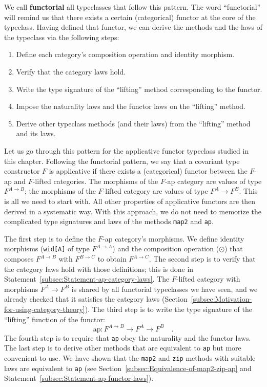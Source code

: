 We call \textbf{functorial} all
typeclasses that follow this pattern. The word \textsf{``}functorial\textsf{''} will
remind us that there exists a certain (categorical) functor at the
core of the typeclass. Having defined that functor, we can derive
the methods and the laws of the typeclass via the following steps:
\begin{enumerate}
\item Define each category\textsf{'}s composition operation and identity morphism.
\item Verify that the category laws hold.
\item Write the type signature of the \textsf{``}lifting\textsf{''} method corresponding
to the functor.
\item Impose the naturality laws and the functor laws on the \textsf{``}lifting\textsf{''}
method.
\item Derive other typeclass methods (and their laws) from the \textsf{``}lifting\textsf{''}
method and its laws.
\end{enumerate}
Let us go through this pattern for the applicative functor typeclass
studied in this chapter. Following the functorial pattern, we say
that a covariant type constructor $F$ is applicative if there exists
a (categorical) functor between the $F$-ap and $F$-lifted categories.
The morphisms of the $F$-ap category are values of type $F^{A\rightarrow B}$;
the morphisms of the $F$-lifted category are values of type $F^{A}\rightarrow F^{B}$.
This is all we need to start with. All other properties of applicative
functors are then derived in a systematic way. With this approach,
we do not need to memorize the complicated type signatures and laws
of the methods \lstinline!map2! and \lstinline!ap!.

The first step is to define the $F$-ap  category\textsf{'}s morphisms. We
define identity morphisms (\lstinline!wid[A]! of type $F^{A\rightarrow A}$)
and the composition operation ($\odot$) that composes $F^{A\rightarrow B}$
with $F^{B\rightarrow C}$ to obtain $F^{A\rightarrow C}$. The second
step is to verify that the category laws hold with those definitions;
this is done in Statement~\ref{subsec:Statement-ap-category-laws}.
The $F$-lifted category with morphisms $F^{A}\rightarrow F^{B}$
is shared by all functorial typeclasses we have seen, and we already
checked that it satisfies the category laws (Section~\ref{subsec:Motivation-for-using-category-theory}).
The third step is to write the type signature of the \textsf{``}lifting\textsf{''}
function of the functor:
\[
\text{ap}:F^{A\rightarrow B}\rightarrow F^{A}\rightarrow F^{B}\quad.
\]
The fourth step is to require that \lstinline!ap! obey the naturality
and the functor laws. The last step is to derive other methods that
are equivalent to \lstinline!ap! but more convenient to use. We have
shown that the \lstinline!map2! and \lstinline!zip! methods with
suitable laws are equivalent to \lstinline!ap! (see Section~\ref{subsec:Equivalence-of-map2-zip-ap}
and Statement~\ref{subsec:Statement-ap-functor-laws}). 

